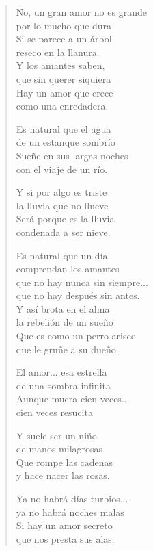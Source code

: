 \documentclass[11pt, portrait, twoside, notitlepage, openright]{book}
\begin{document}
\begin{verse}
No, un gran amor no es grande\\
por lo mucho que dura\\
Si se parece a un árbol\\
reseco en la llanura.\\
Y los amantes saben,\\
que sin querer siquiera\\
Hay un amor que crece\\
como una enredadera.
\newline

Es natural que el agua\\
de un estanque sombrío\\
Sueñe en sus largas noches\\
con el viaje de un río.
\newline

Y si por algo es triste\\
la lluvia que no llueve\\
Será porque es la lluvia\\
condenada a ser nieve.
\newline

Es natural que un día\\
comprendan los amantes\\
que no hay nunca sin siempre...\\
que no hay después sin antes.\\
Y así brota en el alma\\
la rebelión de un sueño\\
Que es como un perro arisco\\
que le gruñe a su dueño.
\newline

El amor... esa estrella\\
de una sombra infinita\\
Aunque muera cien veces...\\
cien veces resucita
\newline

Y suele ser un niño\\
de manos milagrosas\\
Que rompe las cadenas\\
y hace nacer las rosas.
\newline

Ya no habrá días turbios...\\
ya no habrá noches malas\\
Si hay un amor secreto\\
que nos presta sus alas.
\newline


\end{verse}
\end{document}
